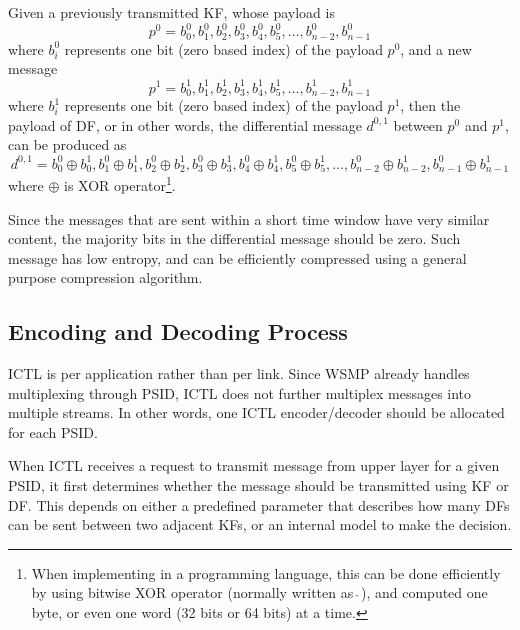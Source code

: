 \documentclass[12pt]{report}
\begin{document}
Given a previously transmitted KF, whose payload is
\begin{equation}
  p^0={b^0_0,b^0_1,b^0_2,b^0_3,b^0_4,b^0_5,\ldots,b^0_{n-2},b^0_{n-1}}
\end{equation}
where $b^0_i$ represents one bit (zero based index) of the payload $p^0$, and a new message
\begin{equation}
  p^1={b^1_0,b^1_1,b^1_2,b^1_3,b^1_4,b^1_5,\ldots,b^1_{n-2},b^1_{n-1}}
\end{equation}
where $b^1_i$ represents one bit (zero based index) of the payload $p^1$, then the payload of DF, or in other words, the differential message $d^{0,1}$ between $p^0$ and $p^1$, can be produced as
\begin{equation}
  d^{0,1}={b^0_0\oplus b^1_0,b^0_1\oplus b^1_1,b^0_2\oplus b^1_2,b^0_3\oplus b^1_3,b^0_4\oplus b^1_4,b^0_5\oplus b^1_5,\ldots,b^0_{n-2}\oplus b^1_{n-2},b^0_{n-1}\oplus b^1_{n-1}}
\end{equation}
where $\oplus $ is XOR operator\footnote{When implementing in a programming language, this can be done efficiently by using bitwise XOR operator (normally written as $\hat{\ }$), and computed one byte, or even one word (32 bits or 64 bits) at a time.}.

Since the messages that are sent within a short time window have very similar content, the majority bits in the differential message should be zero. Such message has low entropy, and can be efficiently compressed using a general purpose compression algorithm.

\subsection{Encoding and Decoding Process}
\label{sec:ictl_process}

ICTL is per application rather than per link. Since WSMP already handles multiplexing through PSID, ICTL does not further multiplex messages into multiple streams. In other words, one ICTL encoder/decoder should be allocated for each PSID.

When ICTL receives a request to transmit message from upper layer for a given PSID, it first determines whether the message should be transmitted using KF or DF. This depends on either a predefined parameter that describes how many DFs can be sent between two adjacent KFs, or an internal model to make the decision.
\end{document}
